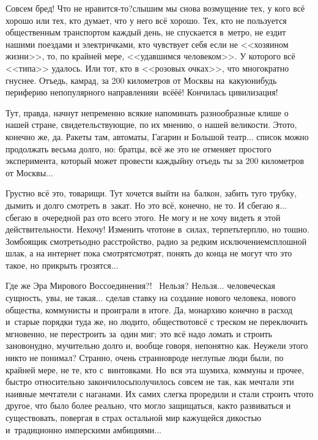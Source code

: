 \diagdash Совсем бред! Что не нравится-то?\mdash слышим мы снова возмущение тех, у кого всё хорошо или тех, кто думает, что у него всё хорошо. Тех, кто не пользуется общественным транспортом каждый день, не спускается в~метро, не ездит нашими поездами и электричками, кто чувствует себя если не <<хозяином жизни>>, то, по крайней мере, <<удавшимся человеком>>. У которого всё <<типа>> удалось. Или тот, кто в <<розовых очках>>, что многократно гнуснее. Отъедь, камрад, за 200 километров от Москвы на~какую\sdash нибудь периферию непопулярного направления\mdash и~всё\sdash ё\sdash ё! Кончилась цивилизация! 

Тут, правда, начнут непременно всякие напоминать разнообразные клише о нашей стране, свидетельствующие, по их мнению, о нашей великости. Это\sdash то, конечно же, да. Ракеты там, автоматы, Гагарин и Большой театр$\ldots$ список можно продолжать весьма долго, но: братцы, всё же это не отменяет простого эксперимента, который может провести каждый\mdash ну отъедь ты за 200 километров от Москвы$\ldots$

Грустно всё это, товарищи. Тут хочется выйти на~балкон, забить туго трубку, дымить и долго смотреть в~закат. Но это всё, конечно, не то. И сбегаю я$\ldots$ сбегаю в~очередной раз ото всего этого. Не могу и не хочу видеть я этой действительности. Не\sdash хо\sdash чу! Изменить что\sdash то\mdash не в~силах, терпеть\mdash терплю, но тошно. Зомбоящик смотреть\mdash одно расстройство, радио за редким исключением\mdash сплошной шлак, а на интернет пока смотрят\sdash смотрят, понять до конца не могут что это такое, но прикрыть грозятся$\ldots$

Где же Эра Мирового Воссоединения?!~\cite{ТуманностьАндромеды} Нельзя? Нельзя$\ldots$ человеческая сущность, увы, не такая$\ldots$ сделав ставку на создание нового человека, нового общества, коммунисты и проиграли в итоге. Да, монархию конечно в расход и~старые порядки туда же, но люди\sdash то, общество\sdash то\mdash всё с треском не переключить мгновенно, не перестроить за~один миг; это всё надо ломать и строить заново\mdash нудно, мучительно долго и, вообще говоря, непонятно как. Неужели этого никто не понимал? Странно, очень странно\mdash вроде неглупые люди были, по крайней мере, не те, кто с~винтовками. Но~вся эта шумиха, коммуны и прочее, быстро относительно закончилось\mdash получилось совсем не так, как мечтали эти наивные мечтатели с наганами. Их самих слегка проредили и стали строить что\sdash то другое, что было более реально, что могло защищаться, как\sdash то развиваться и существовать, повергая в страх остальной мир кажущейся дикостью и~традиционно имперскими амбициями$\ldots$

